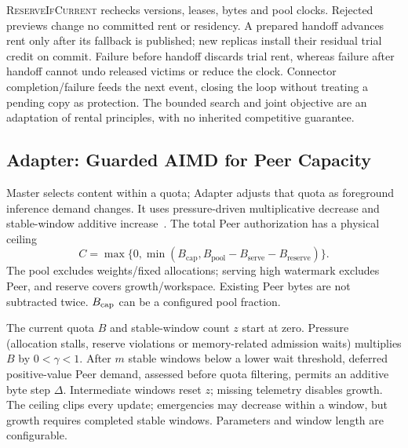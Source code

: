 \textsc{ReserveIfCurrent} rechecks versions, leases, bytes and pool clocks.
Rejected previews change no committed rent or residency. A prepared
handoff advances rent only after its fallback is published; new replicas
install their residual trial credit on commit. Failure before handoff
discards trial rent, whereas failure after handoff cannot undo released
victims or reduce the clock. Connector completion/failure feeds the next
event, closing the loop without treating a pending copy as protection.
The bounded search and joint objective are an adaptation of rental
principles, with no inherited competitive guarantee.

\subsection{Adapter: Guarded AIMD for Peer Capacity}
\label{sec:adapter}

Master selects content within a quota; Adapter adjusts that quota as
foreground inference demand changes. It uses pressure-driven multiplicative
decrease and stable-window additive increase~\cite{chiu1989aimd}.
The total Peer authorization has a physical ceiling
\begin{equation}
 C=\max\{0,\min(B_{\mathrm{cap}},
 B_{\mathrm{pool}}-B_{\mathrm{serve}}-B_{\mathrm{reserve}})\}.
 \label{eq:peer-ceiling}
\end{equation}
The pool excludes weights/fixed allocations; serving high watermark
excludes Peer, and reserve covers growth/workspace. Existing Peer bytes
are not subtracted twice. $B_{\rm cap}$ can be a configured pool fraction.

The current quota $B$ and stable-window count $z$ start at zero.
Pressure (allocation stalls, reserve violations or
memory-related admission waits) multiplies $B$ by $0<\gamma<1$. After $m$
stable windows below a lower wait threshold, deferred positive-value Peer
demand, assessed before quota filtering, permits an additive byte step
$\Delta$. Intermediate windows reset
$z$; missing telemetry disables growth. The ceiling clips every update;
emergencies may decrease within a window, but growth requires completed
stable windows. Parameters and window length are configurable.

